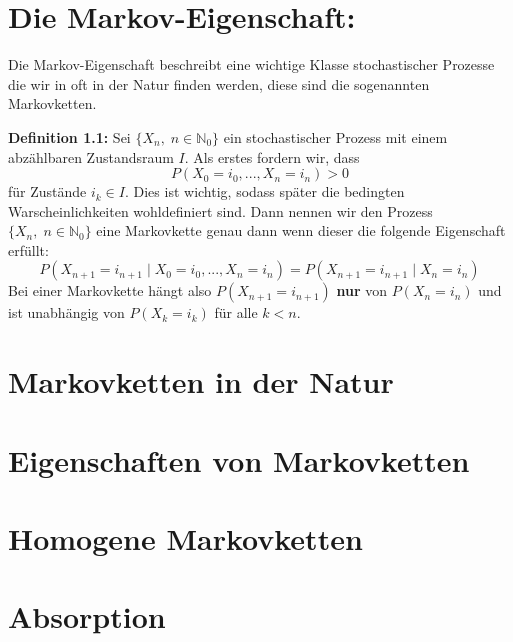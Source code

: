 \documentclass[a4paper]{article}
\begin{document}
	\section{Die Markov-Eigenschaft:}
	Die Markov-Eigenschaft beschreibt eine wichtige Klasse stochastischer Prozesse
	die wir in oft in der Natur finden werden, diese sind die sogenannten Markovketten.

	\vspace{\baselineskip}
	\textbf{Definition 1.1:}
	Sei $\{
		X_n, \; n \in \mathbb{N}_0
	\} $ ein stochastischer Prozess mit einem abzählbaren Zustandsraum $I$.
	Als erstes fordern wir, dass
	\[
		P(X_0 = i_0, ..., X_n = i_n) > 0
	\]
	für Zustände $i_k \in I$. Dies ist wichtig, sodass später die bedingten Warscheinlichkeiten
	wohldefiniert sind. Dann nennen wir den Prozess $\{
		X_n, \; n \in \mathbb{N}_0 
	\} $ eine Markovkette genau dann wenn dieser die folgende Eigenschaft erfüllt:
	\[
		P(X_{n+1} = i_{n+1} \; | \; X_0 = i_0, ..., X_n = i_n)
		= P(X_{n+1} = i_{n+1} \; | \; X_n = i_n)
	\] 
	Bei einer Markovkette hängt also $P(X_{n+1} = i_{n+1})$ \textbf{nur} von $P(X_{n} = i_{n})$
	und ist unabhängig von $P(X_k = i_k)$ für alle $k < n$.
	\section{Markovketten in der Natur}
	\section{Eigenschaften von Markovketten}
	\section{Homogene Markovketten}
	\section{Absorption}
\end{document}
